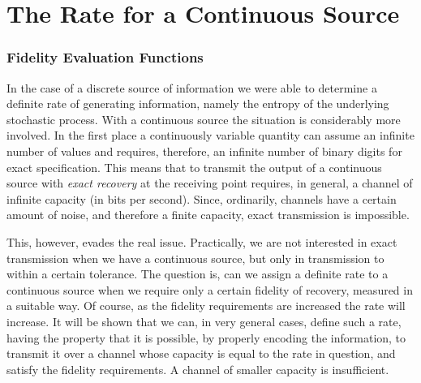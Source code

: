 \part{The Rate for a Continuous Source}
\section{Fidelity Evaluation Functions}

In the case of a discrete source of information we were able to determine a
definite rate of generating information, namely the entropy of the
underlying stochastic process.  With a continuous source the situation is
considerably more involved.  In the first place a continuously variable
quantity can assume an infinite number of values and requires, therefore,
an infinite number of binary digits for exact specification.  This means
that to transmit the output of a continuous source with \emph{exact
recovery} at the receiving point requires, in general, a channel of
infinite capacity (in bits per second).  Since, ordinarily, channels have a
certain amount of noise, and therefore a finite capacity, exact
transmission is impossible.

This, however, evades the real issue.  Practically, we are not interested
in exact transmission when we have a continuous source, but only in
transmission to within a certain tolerance.  The question is, can we assign
a definite rate to a continuous source when we require only a certain
fidelity of recovery, measured in a suitable way.  Of course, as the fidelity
requirements are increased the rate will increase.  It will be shown that
we can, in very general cases, define such a rate, having the property that
it is possible, by properly encoding the information, to transmit it over a
channel whose capacity is equal to the rate in question, and satisfy the
fidelity requirements.  A channel of smaller capacity is insufficient.

